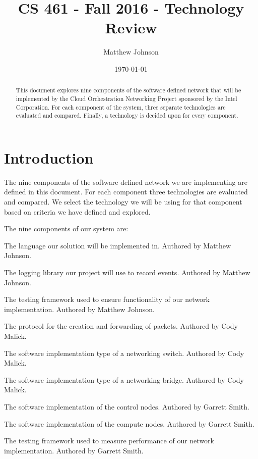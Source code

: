 \documentclass[10pt,letterpaper,onecolumn,draftclsnofoot]{IEEEtran}
\begin{document}
\begin{titlepage}
	\title{CS 461 - Fall 2016 - Technology Review}
	\author{Matthew Johnson}
	\date{\today}
	\maketitle
	\vspace{4cm}
	\begin{abstract}
		\noindent This document explores nine components of the software
		defined network that will be implemented by the Cloud
		Orchestration Networking Project sponsored by the Intel
		Corporation. For each component of the system, three separate
		technologies are evaluated and compared. Finally, a technology
		is decided upon for every component.
	\end{abstract}

\end{titlepage}
\tableofcontents
\clearpage

\section{Introduction}

The nine components of the software defined network we are implementing are
defined in this document. For each component three technologies are evaluated
and compared. We select the technology we will be using for that component
based on criteria we have defined and explored.

The nine components of our system are:

\begin{description}[leftmargin=12em,style=nextline]
	\item[Programming Languages]
		The language our solution will be implemented in. Authored by
		Matthew Johnson.
	\item[Logging]
		The logging library our project will use to record events.
		Authored by Matthew Johnson.
	\item[Functional Testing Framework]
		The testing framework used to ensure functionality of our
		network implementation. Authored by Matthew Johnson.
	\item[Packet Level Protocols]
		The protocol for the creation and forwarding of packets.
		Authored by Cody Malick.
	\item[Switch Implementation]
		The software implementation type of a networking switch.
		Authored by Cody Malick.
	\item[Bridge Implementation]
		The software implementation type of a networking bridge.
		Authored by Cody Malick.
	\item[CNCI Implementation]
		The software implementation of the control nodes. Authored by
		Garrett Smith.
	\item[Compute Node Implementation]
		The software implementation of the compute nodes. Authored by
		Garrett Smith.
	\item[Performance Testing Framework]
		The testing framework used to measure performance of our network
		implementation. Authored by Garrett Smith.
\end{description}
\end{document}
